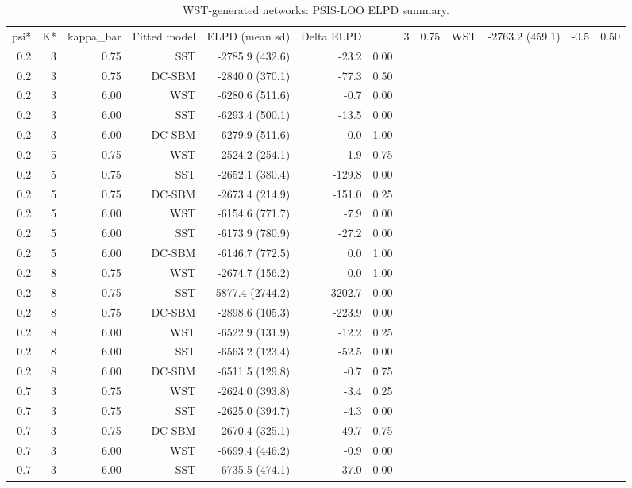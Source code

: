 \begin{table}[!h]
\centering
\caption{WST-generated networks: PSIS-LOO ELPD summary.\\\label{tab:elpd-wst-full-simulation-crossfit-final-DemoKvar-run-20260224-155823}}
\centering
\begin{tabular}[t]{rrrrrrr}
\toprule
psi* & K* & kappa_bar & Fitted model & ELPD (mean sd) & Delta ELPD & %
 & 3 & 0.75 & WST & -2763.2 (459.1) & -0.5 & 0.50\\
0.2 & 3 & 0.75 & SST & -2785.9 (432.6) & -23.2 & 0.00\\
0.2 & 3 & 0.75 & DC-SBM & -2840.0 (370.1) & -77.3 & 0.50\\
0.2 & 3 & 6.00 & WST & -6280.6 (511.6) & -0.7 & 0.00\\
0.2 & 3 & 6.00 & SST & -6293.4 (500.1) & -13.5 & 0.00\\
0.2 & 3 & 6.00 & DC-SBM & -6279.9 (511.6) & 0.0 & 1.00\\
0.2 & 5 & 0.75 & WST & -2524.2 (254.1) & -1.9 & 0.75\\
0.2 & 5 & 0.75 & SST & -2652.1 (380.4) & -129.8 & 0.00\\
0.2 & 5 & 0.75 & DC-SBM & -2673.4 (214.9) & -151.0 & 0.25\\
0.2 & 5 & 6.00 & WST & -6154.6 (771.7) & -7.9 & 0.00\\
0.2 & 5 & 6.00 & SST & -6173.9 (780.9) & -27.2 & 0.00\\
0.2 & 5 & 6.00 & DC-SBM & -6146.7 (772.5) & 0.0 & 1.00\\
0.2 & 8 & 0.75 & WST & -2674.7 (156.2) & 0.0 & 1.00\\
0.2 & 8 & 0.75 & SST & -5877.4 (2744.2) & -3202.7 & 0.00\\
0.2 & 8 & 0.75 & DC-SBM & -2898.6 (105.3) & -223.9 & 0.00\\
0.2 & 8 & 6.00 & WST & -6522.9 (131.9) & -12.2 & 0.25\\
0.2 & 8 & 6.00 & SST & -6563.2 (123.4) & -52.5 & 0.00\\
0.2 & 8 & 6.00 & DC-SBM & -6511.5 (129.8) & -0.7 & 0.75\\
0.7 & 3 & 0.75 & WST & -2624.0 (393.8) & -3.4 & 0.25\\
0.7 & 3 & 0.75 & SST & -2625.0 (394.7) & -4.3 & 0.00\\
0.7 & 3 & 0.75 & DC-SBM & -2670.4 (325.1) & -49.7 & 0.75\\
0.7 & 3 & 6.00 & WST & -6699.4 (446.2) & -0.9 & 0.00\\
0.7 & 3 & 6.00 & SST & -6735.5 (474.1) & -37.0 & 0.00\\

\end{tabular}
\end{table}
